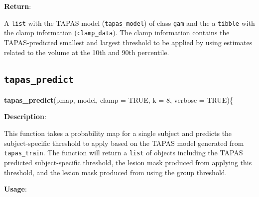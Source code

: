 \documentclass[]{article}
\newenvironment{Shaded}{\begin{snugshade}}{\end{snugshade}}
\newcommand{\DataTypeTok}[1]{\textcolor[rgb]{0.13,0.29,0.53}{#1}}
\newcommand{\DecValTok}[1]{\textcolor[rgb]{0.00,0.00,0.81}{#1}}
\newcommand{\KeywordTok}[1]{\textcolor[rgb]{0.13,0.29,0.53}{\textbf{#1}}}
\newcommand{\NormalTok}[1]{#1}
\newcommand{\OtherTok}[1]{\textcolor[rgb]{0.56,0.35,0.01}{#1}}
\begin{document}
\textbf{Return}:

A \texttt{list} with the TAPAS model (\texttt{tapas\_model}) of class
\texttt{gam} and the a \texttt{tibble} with the clamp information
(\texttt{clamp\_data}). The clamp information contains the
TAPAS-predicted smallest and largest threshold to be applied by using
estimates related to the volume at the 10th and 90th percentile.

\hypertarget{tapas_predict}{%
\subsection{\texorpdfstring{\texttt{tapas\_predict}}{tapas\_predict}}\label{tapas_predict}}

\begin{Shaded}
\begin{Highlighting}[]
\KeywordTok{tapas_predict}\NormalTok{(pmap, }
\NormalTok{              model, }
              \DataTypeTok{clamp =} \OtherTok{TRUE}\NormalTok{, }
              \DataTypeTok{k =} \DecValTok{8}\NormalTok{, }
              \DataTypeTok{verbose =} \OtherTok{TRUE}\NormalTok{)\{}
\end{Highlighting}
\end{Shaded}

\textbf{Description}:

This function takes a probability map for a single subject and predicts
the subject-specific threshold to apply based on the TAPAS model
generated from \texttt{tapas\_train}. The function will return a
\texttt{list} of objects including the TAPAS predicted subject-specific
threshold, the lesion mask produced from applying this threshold, and
the lesion mask produced from using the group threshold.

\textbf{Usage}:
\end{document}
